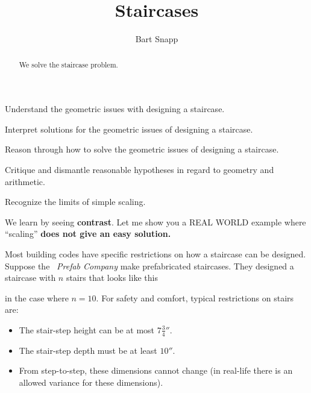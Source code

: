\documentclass[noauthor,nooutcomes,handout]{ximera}
\title{Staircases}
\author{Bart Snapp}
\begin{document}
\begin{abstract}
  We solve the staircase problem.
\end{abstract}
\maketitle

\begin{listOutcomes}
\item{Understand the geometric issues with designing a staircase.}
\item{Interpret solutions for the geometric issues of designing a staircase.}
\item{Reason through how to solve the geometric issues of designing a staircase.}
\item{Critique and dismantle reasonable hypotheses in regard to geometry and arithmetic.}
\item{Recognize the limits of simple scaling.}
\end{listOutcomes}

We learn by seeing \textbf{contrast}. Let me show you a REAL WORLD
example where ``scaling'' \textbf{does not give an easy solution.}


Most building codes have specific restrictions on how a staircase can
be designed. Suppose the \mooculus~\textit{Prefab Company} make
prefabricated staircases. They designed a staircase with $n$ stairs
that looks like this
\begin{center}
\end{center}
in the case where $n=10$. For safety and comfort, typical restrictions
on stairs are:
\begin{itemize}
\item The stair-step height can be at most $7\frac{3}{4}''$. 
\item The stair-step depth must be at least $10''$.
\item From step-to-step, these dimensions cannot change (in real-life there is
an allowed variance for these dimensions).
\end{itemize}
\end{document}
